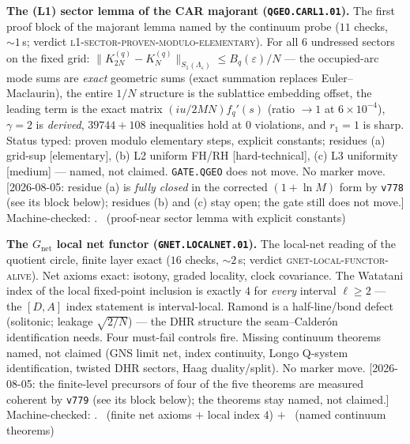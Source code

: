 \par\smallskip\noindent\textbf{The (L1) sector lemma of the CAR
majorant (\texttt{QGEO.CARL1.01}).}
The first proof block of the majorant lemma named by the continuum
probe ($11$ checks, ${\sim}1$\,s; verdict
\textsc{l1-sector-proven-modulo-elementary}).  For all $6$
undressed sectors on the fixed grid:
$\|K_{2N}^{(q)}-K_N^{(q)}\|_{S_1(\Lambda_\varepsilon)}\le
B_q(\varepsilon)/N$ --- the occupied-arc mode sums are \emph{exact}
geometric sums (exact summation replaces Euler--Maclaurin), the
entire $1/N$ structure is the sublattice embedding offset, the
leading term is the exact matrix $(iu/2MN)f_q'(s)$ (ratio $\to1$ at
$6\times10^{-4}$), $\gamma=2$ is \emph{derived}, $39744{+}108$
inequalities hold at $0$ violations, and $r_1=1$ is sharp.  Status
typed: proven modulo elementary steps, explicit constants; residues
(a) grid-sup [elementary], (b) L2 uniform FH/RH [hard-technical],
(c) L3 uniformity [medium] --- named, not claimed.
\texttt{GATE.QGEO} does not move.  No marker move.
[2026-08-05: residue (a) is \emph{fully closed} in the corrected
$(1+\ln M)$ form by \texttt{v778} (see its block below); residues
(b) and (c) stay open; the gate still does not move.]
Machine-checked: .
\mE\ (proof-near sector lemma with explicit constants)
\par\smallskip

\par\smallskip\noindent\textbf{The $G_{\mathrm{net}}$ local net
functor (\texttt{GNET.LOCALNET.01}).}
The local-net reading of the quotient circle, finite layer exact
($16$ checks, ${\sim}2$\,s; verdict
\textsc{gnet-local-functor-alive}).  Net axioms exact: isotony,
graded locality, clock covariance.  The Watatani index of the local
fixed-point inclusion is exactly $4$ for \emph{every} interval
$\ell\ge2$ --- the $[D,A]$ index statement is interval-local.
Ramond is a half-line/bond defect (solitonic; leakage
$\sqrt{2/N}$) --- the DHR structure the seam--Calder\'on
identification needs.  Four must-fail controls fire.  Missing
continuum theorems named, not claimed (GNS limit net, index
continuity, Longo Q-system identification, twisted DHR sectors,
Haag duality/split).  No marker move.  [2026-08-05: the
finite-level precursors of four of the five theorems are measured
coherent by \texttt{v779} (see its block below); the theorems stay
named, not claimed.]
Machine-checked: .
\mE\ (finite net axioms $+$ local index $4$) $+$ \mC\ (named
continuum theorems)
\par\smallskip

